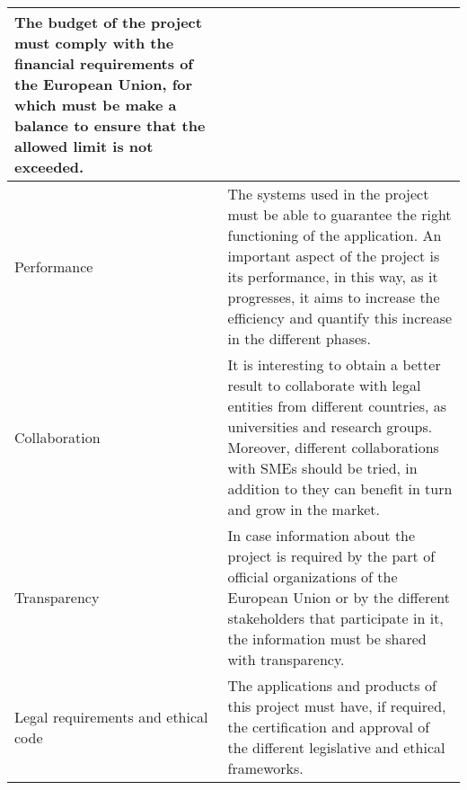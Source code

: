 \begin{center}
\begin{longtable}{|p{2cm}|p{10cm}|}
		The budget of the project must comply with the financial requirements of the European Union, for which must be make a balance to ensure that the allowed limit is not exceeded.
		\\ 
		\hline 
		Performance & The systems used in the project must be able to guarantee the right functioning of the application. An important aspect of the project is its performance, in this way, as it progresses, it aims to increase the efficiency and quantify this increase in the different phases. 
		\\ 
		\hline 
		Collaboration & It is interesting to obtain a better result to collaborate with legal entities from different countries, as universities and research groups. Moreover, different collaborations with SMEs should be tried, in addition to they can benefit in turn and grow in the market. 
		\\ 
		\hline
		Transparency & In case information about the project is required by the part of official organizations of the European Union or by the different stakeholders that participate in it, the information must be shared with transparency. 
		\\ 
		\hline
		Legal requirements and ethical code & The applications and products of this project must have, if required, the certification and approval of the different legislative and ethical frameworks. 
		\\ 
		\hline
		
	\end{longtable} 
\end{center}